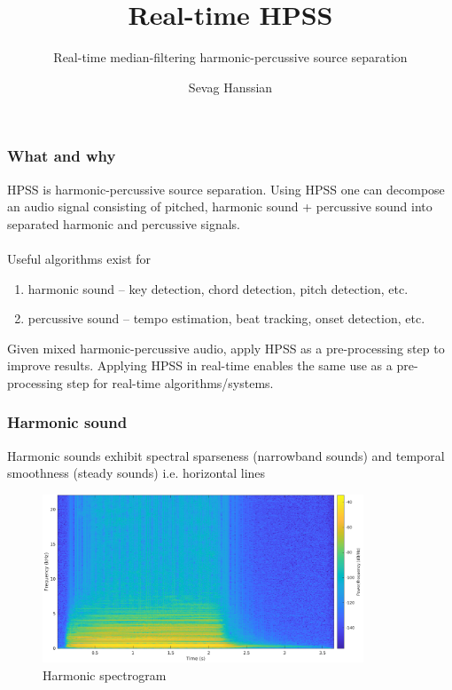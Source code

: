 \documentclass{beamer}
\title{Real-time HPSS}
\subtitle{Real-time median-filtering harmonic-percussive source separation}
\author{Sevag Hanssian}
\institute{McGill University}
\begin{document}
\begin{frame}
\maketitle
\end{frame}

\begin{frame}
	\frametitle{What and why}
	HPSS is harmonic-percussive source separation. Using HPSS one can decompose an audio signal consisting of pitched, harmonic sound + percussive sound into separated harmonic and percussive signals.\\\ \\
	Useful algorithms exist for
	\begin{enumerate}
		\item harmonic sound -- key detection, chord detection, pitch detection, etc.
		\item percussive sound -- tempo estimation, beat tracking, onset detection, etc.
	\end{enumerate}
	Given mixed harmonic-percussive audio, apply HPSS as a pre-processing step to improve results. Applying HPSS in real-time enables the same use as a pre-processing step for real-time algorithms/systems.
\end{frame}

\begin{frame}
	\frametitle{Harmonic sound}
	Harmonic sounds exhibit spectral sparseness (narrowband sounds) and temporal smoothness (steady sounds) i.e. horizontal lines\\
	\begin{figure}
	\includegraphics[height=5cm]{../images/violaspecgram.png}
		\caption{Harmonic spectrogram}
	\end{figure}
\end{frame}
\end{document}
